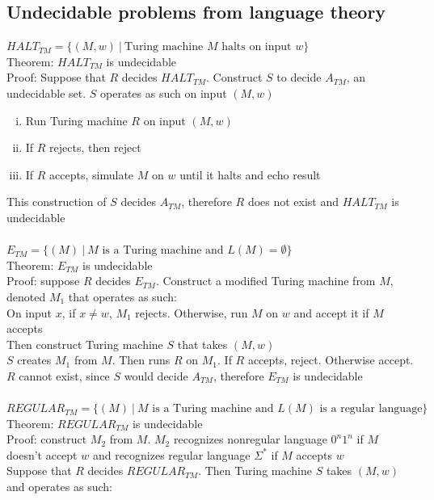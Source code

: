 \documentclass{article}
\newcommand*{\<}{\langle}
\renewcommand*{\>}{\rangle}
\begin{document}
		\subsection{Undecidable problems from language theory}
			$HALT_{TM} = \{(M, w)\:|\:\text{Turing machine }M\text{ halts on input }w\}$ \\
			Theorem: $HALT_{TM}$ is undecidable \\
			Proof: Suppose that $R$ decides $HALT_{TM}$. Construct $S$ to decide $A_{TM}$, an undecidable set. $S$ operates as such on input $(M, w)$
			\begin{enumerate}[(i)]
				\item Run Turing machine $R$ on input $(M, w)$
				\item If $R$ rejects, then reject
				\item If $R$ accepts, simulate $M$ on $w$ until it halts and echo result
				\end{enumerate}
			This construction of $S$ decides $A_{TM}$, therefore $R$ does not exist and $HALT_{TM}$ is undecidable \\
			\\
			$E_{TM} = \{(M)\:|\:M\text{ is a Turing machine and }L(M) = \emptyset\}$ \\
			Theorem: $E_{TM}$ is undecidable \\
			Proof: suppose $R$ decides $E_{TM}$. Construct a modified Turing machine from $M$, denoted $M_1$ that operates as such: \\
			On input $x$, if $x \neq w$, $M_1$ rejects. Otherwise, run $M$ on $w$ and accept it if $M$ accepts \\
			Then construct Turing machine $S$ that takes $(M, w)$ \\
			$S$ creates $M_1$ from $M$. Then runs $R$ on $M_1$. If $R$ accepts, reject. Otherwise accept. \\
			$R$ cannot exist, since $S$ would decide $A_{TM}$, therefore $E_{TM}$ is undecidable \\
			\\
			$REGULAR_{TM} = \{(M)\:|\:M\text{ is a Turing machine and }L(M)\text{ is a regular language}\}$ \\
			Theorem: $REGULAR_{TM}$ is undecidable \\
			Proof: construct $M_2$ from $M$. $M_2$ recognizes nonregular language $0^n1^n$ if $M$ doesn't accept $w$ and recognizes regular language $\Sigma^*$ if $M$ accepts $w$ \\
			Suppose that $R$ decides $REGULAR_{TM}$. Then Turing machine $S$ takes $(M, w)$ and operates as such:
\end{document}
